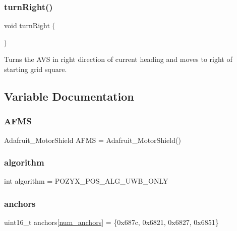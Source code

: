 \subsubsection{\texorpdfstring{turn\+Right()}{turnRight()}}
{\footnotesize\ttfamily void turn\+Right (\begin{DoxyParamCaption}{ }\end{DoxyParamCaption})}

Turns the A\+VS in right direction of current heading and moves to right of starting grid square. 

\subsection{Variable Documentation}
\mbox{\label{bot_main_8ino_a7e8151031cf9a913ec4a28a5f56ed7c0}} 
\subsubsection{\texorpdfstring{A\+F\+MS}{AFMS}}
{\footnotesize\ttfamily Adafruit\+\_\+\+Motor\+Shield A\+F\+MS = Adafruit\+\_\+\+Motor\+Shield()}

\mbox{\label{bot_main_8ino_a92d3a0b679d3adc3b4b513f8e26e7f4c}} 
\subsubsection{\texorpdfstring{algorithm}{algorithm}}
{\footnotesize\ttfamily int algorithm = P\+O\+Z\+Y\+X\+\_\+\+P\+O\+S\+\_\+\+A\+L\+G\+\_\+\+U\+W\+B\+\_\+\+O\+N\+LY}

\mbox{\label{bot_main_8ino_a40781b19eab312bdfa08034230bb64d1}} 
\subsubsection{\texorpdfstring{anchors}{anchors}}
{\footnotesize\ttfamily uint16\+\_\+t anchors\mbox{[}\mbox{\hyperlink{bot_main_8ino_af45be5355306144528cdfb308bd00859}{num\+\_\+anchors}}\mbox{]} = \{0x687c, 0x6821, 0x6827, 0x6851\}}

